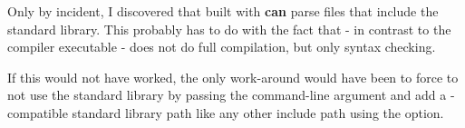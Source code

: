 Only by incident, I discovered that  built with  \textbf{can} parse files that include the   standard library. This probably has to do with the fact that  - in contrast to the  compiler executable - does not do full compilation, but only syntax checking.

If this would not have worked, the only work-around would have been to force  to not use the standard library by passing the  command-line argument and add a -compatible standard library path like any other include path using the  option.
